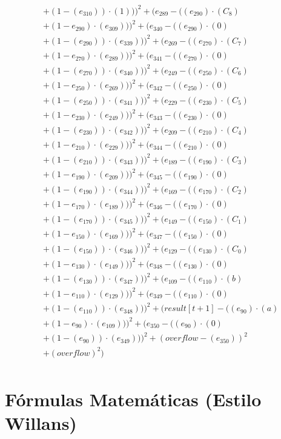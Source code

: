 \documentclass[10pt, a4paper]{article}
\begin{document}
\begin{small}
\begin{align*}
& + (1 - (e_{310})) \cdot (1)))^{2} + (e_{289} - ((e_{290})  \cdot  (C_{8}) \\
& + (1 - e_{290})  \cdot  (e_{309})))^{2} + (e_{340} - ((e_{290}) \cdot (0) \\
& + (1 - (e_{290})) \cdot (e_{339})))^{2} + (e_{269} - ((e_{270})  \cdot  (C_{7}) \\
& + (1 - e_{270})  \cdot  (e_{289})))^{2} + (e_{341} - ((e_{270}) \cdot (0) \\
& + (1 - (e_{270})) \cdot (e_{340})))^{2} + (e_{249} - ((e_{250})  \cdot  (C_{6}) \\
& + (1 - e_{250})  \cdot  (e_{269})))^{2} + (e_{342} - ((e_{250}) \cdot (0) \\
& + (1 - (e_{250})) \cdot (e_{341})))^{2} + (e_{229} - ((e_{230})  \cdot  (C_{5}) \\
& + (1 - e_{230})  \cdot  (e_{249})))^{2} + (e_{343} - ((e_{230}) \cdot (0) \\
& + (1 - (e_{230})) \cdot (e_{342})))^{2} + (e_{209} - ((e_{210})  \cdot  (C_{4}) \\
& + (1 - e_{210})  \cdot  (e_{229})))^{2} + (e_{344} - ((e_{210}) \cdot (0) \\
& + (1 - (e_{210})) \cdot (e_{343})))^{2} + (e_{189} - ((e_{190})  \cdot  (C_{3}) \\
& + (1 - e_{190})  \cdot  (e_{209})))^{2} + (e_{345} - ((e_{190}) \cdot (0) \\
& + (1 - (e_{190})) \cdot (e_{344})))^{2} + (e_{169} - ((e_{170})  \cdot  (C_{2}) \\
& + (1 - e_{170})  \cdot  (e_{189})))^{2} + (e_{346} - ((e_{170}) \cdot (0) \\
& + (1 - (e_{170})) \cdot (e_{345})))^{2} + (e_{149} - ((e_{150})  \cdot  (C_{1}) \\
& + (1 - e_{150})  \cdot  (e_{169})))^{2} + (e_{347} - ((e_{150}) \cdot (0) \\
& + (1 - (e_{150})) \cdot (e_{346})))^{2} + (e_{129} - ((e_{130})  \cdot  (C_{0}) \\
& + (1 - e_{130})  \cdot  (e_{149})))^{2} + (e_{348} - ((e_{130}) \cdot (0) \\
& + (1 - (e_{130})) \cdot (e_{347})))^{2} + (e_{109} - ((e_{110})  \cdot  (b) \\
& + (1 - e_{110})  \cdot  (e_{129})))^{2} + (e_{349} - ((e_{110}) \cdot (0) \\
& + (1 - (e_{110})) \cdot (e_{348})))^{2} + (result[t+1] - ((e_{90})  \cdot  (a) \\
& + (1 - e_{90})  \cdot  (e_{109})))^{2} + (e_{350} - ((e_{90}) \cdot (0) \\
& + (1 - (e_{90})) \cdot (e_{349})))^{2} + (overflow - (e_{350}))^{2} \\
& + (overflow)^{2}) \\
\end{align*}
\end{small}\part{Fórmulas Matemáticas (Estilo Willans)}
\end{document}
